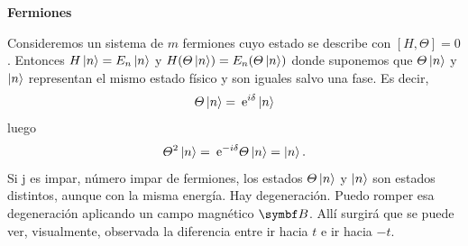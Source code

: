 \documentclass[10pt,oneside]{CBFT_book}
\begin{document}
\begin{ejemplo}{\bf Fermiones}

Consideremos un sistema de $m$ fermiones cuyo estado se describe con $[H,\Theta]=0$. Entonces
$ H\Ket{n} = E_n \Ket{n}$ y $ H( \Theta \Ket{n} ) = E_n ( \Theta \Ket{n} ) $ donde suponemos que $\Theta\Ket{n}$
y $\Ket{n}$ representan el mismo estado físico y son iguales salvo una fase.
Es decir,
\[
	\Theta \Ket{n} = \:\mathrm{e}^{i \delta} \Ket{n}
\]
luego
\[
	\Theta^2 \Ket{n} = \:\mathrm{e}^{-i \delta} \Theta \Ket{n} = \Ket{n}.
\]
Si j es impar, número impar de fermiones, los estados $\Theta \Ket{n}$ y $\Ket{n}$ son estados distintos,
aunque con la misma energía. Hay degeneración.
Puedo romper esa degeneración aplicando un campo magnético $\vb B$. Allí surgirá que se puede ver, visualmente,
observada la diferencia entre ir hacia $t$ e ir hacia $-t$.
 
\end{ejemplo}


\end{document}

